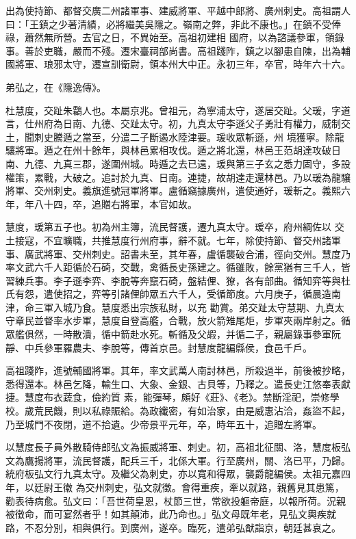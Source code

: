 \begin{pinyinscope}
 出為使持節、都督交廣二州諸軍事、建威將軍、平越中郎將、廣州刺史。高祖謂人曰：「王鎮之少著清績，必將繼美吳隱之。嶺南之弊，非此不康也。」在鎮不受俸祿，蕭然無所營。去官之日，不異始至。高祖初建相
 國府，以為諮議參軍，領錄事。善於吏職，嚴而不殘。遷宋臺祠部尚書。高祖踐阼，鎮之以腳患自陳，出為輔國將軍、琅邪太守，遷宣訓衛尉，領本州大中正。永初三年，卒官，時年六十六。



 弟弘之，在《隱逸傳》。



 杜慧度，交趾朱鸘人也。本屬京兆。曾祖元，為寧浦太守，遂居交趾。父瑗，字道言，仕州府為日南、九德、交趾太守。初，九真太守李遜父子勇壯有權力，威制交土，聞刺史騰遁之當至，分遣二子斷遏水陸津要。瑗收眾斬遜，州
 境獲寧。除龍驤將軍。遁之在州十餘年，與林邑累相攻伐。遁之將北還，林邑王范胡達攻破日南、九德、九真三郡，遂圍州城。時遁之去已遠，瑗與第三子玄之悉力固守，多設權策，累戰，大破之。追討於九真、日南。連捷，故胡達走還林邑。乃以瑗為龍驤將軍、交州刺史。義旗進號冠軍將軍。盧循竊據廣州，遣使通好，瑗斬之。義熙六年，年八十四，卒，追贈右將軍，本官如故。



 慧度，瑗第五子也。初為州主簿，流民督護，遷九真太守。瑗卒，府州綱佐以
 交土接寇，不宜曠職，共推慧度行州府事，辭不就。七年，除使持節、督交州諸軍事、廣武將軍、交州刺史。詔書未至，其年春，盧循襲破合浦，徑向交州。慧度乃率文武六千人距循於石碕，交戰，禽循長史孫建之。循雖敗，餘黨猶有三千人，皆習練兵事。李子遜李弈、李脫等奔竄石碕，盤結俚、獠，各有部曲。循知弈等與杜氏有怨，遣使招之，弈等引諸俚帥眾五六千人，受循節度。六月庚子，循晨造南津，命三軍入城乃食。慧度悉出宗族私財，以充
 勸賞。弟交趾太守慧期、九真太守章民並督率水步軍，慧度自登高艦，合戰，放火箭雉尾炬，步軍夾兩岸射之。循眾艦俱然，一時散潰，循中箭赴水死。斬循及父嘏，并循二子，親屬錄事參軍阮靜、中兵參軍羅農夫、李脫等，傳首京邑。封慧度龍編縣侯，食邑千戶。



 高祖踐阼，進號輔國將軍。其年，率文武萬人南討林邑，所殺過半，前後被抄略，悉得還本。林邑乞降，輸生口、大象、金銀、古貝等，乃釋之。遣長史江悠奉表獻捷。慧度布衣蔬食，儉約質
 素，能彈琴，頗好《莊》、《老》。禁斷淫祀，崇修學校。歲荒民饑，則以私祿賑給。為政纖密，有如治家，由是威惠沾洽，姦盜不起，乃至城門不夜閉，道不拾遺。少帝景平元年，卒，時年五十，追贈左將軍。



 以慧度長子員外散騎侍郎弘文為振威將軍、刺史。初，高祖北征關、洛，慧度板弘文為鷹揚將軍，流民督護，配兵三千，北係大軍。行至廣州，關、洛已平，乃歸。統府板弘文行九真太守。及繼父為刺史，亦以寬和得眾，襲爵龍編侯。太祖元嘉四年，以廷尉王徽
 為交州刺史，弘文就徵。會得重疾，牽以就路，親舊見其患篤，勸表待病愈。弘文曰：「吾世荷皇恩，杖節三世，常欲投軀帝庭，以報所荷。況親被徵命，而可宴然者乎！如其顛沛，此乃命也。」弘文母既年老，見弘文輿疾就路，不忍分別，相與俱行。到廣州，遂卒。臨死，遣弟弘猷詣京，朝廷甚哀之。




\end{pinyinscope}
